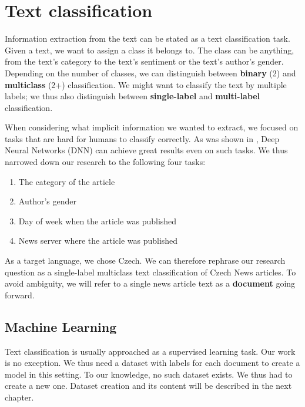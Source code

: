 \chapter{Text classification}
Information extraction from the text can be stated as a text classification task.
Given a text, we want to assign a class it belongs to.
The class can be anything, from the text's category to the text's sentiment or the text's author's gender.
Depending on the number of classes, we can distinguish between \textbf{binary} (2) and \textbf{multiclass} (2+) classification.
We might want to classify the text by multiple labels; we thus also distinguish between \textbf{single-label}
and \textbf{multi-label} classification.


When considering what implicit information we wanted to extract, we focused on tasks
that are hard for humans to classify correctly. As was shown in \cite{wangDeepNeuralNetworks2017},
Deep Neural Networks (DNN) can achieve great results even on such tasks.
We thus narrowed down our research to the following four tasks:
\begin{enumerate}
    \item The category of the article
    \item Author's gender
    \item Day of week when the article was published
    \item News server where the article was published
\end{enumerate}
As a target language, we chose Czech.
We can therefore rephrase our research question as a single-label multiclass text classification of Czech News articles.
To avoid ambiguity, we will refer to a single news article text as a \textbf{document} going forward.

\section{Machine Learning}
Text classification is usually approached as a supervised learning task. Our work is no exception.
We thus need a dataset with labels for each document to create a model in this setting.
To our knowledge, no such dataset exists. We thus had to create a new one.
Dataset creation and its content will be described in the next chapter.

